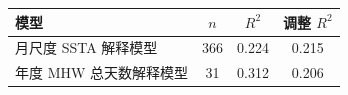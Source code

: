 \begin{tabular}{lccc}
\hline
模型 & $n$ & $R^2$ & 调整 $R^2$ \\
\hline
月尺度 SSTA 解释模型 & 366 & 0.224 & 0.215 \\
年度 MHW 总天数解释模型 & 31 & 0.312 & 0.206 \\
\hline
\end{tabular}
